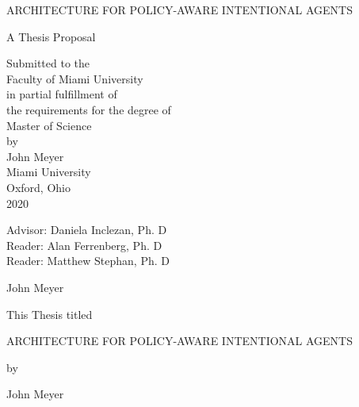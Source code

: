 \documentclass[12pt, oneside]{book2}
\newcommand{\documentTitle}{ARCHITECTURE FOR POLICY-AWARE INTENTIONAL AGENTS}
\newcommand{\documentType}{Thesis Proposal}
\newcommand{\documentAuthor}{John Meyer}
\newcommand{\documentYear}{2020}
\newcommand{\thesisAdvisor}{Daniela Inclezan, Ph. D}
\newcommand{\thesisFirstReader}{Alan Ferrenberg, Ph. D}
\newcommand{\thesisSecondReader}{Matthew Stephan, Ph. D}
\theoremstyle{definition}
\begin{document}
\begin{titlepage}
\begin{center}

    \documentTitle

    \vspace{1.5cm}

    A \documentType \\

    \vspace{0.5cm}

    Submitted to the \\
    Faculty of Miami University \\
    in partial fulfillment of \\
    the requirements for the degree of \\
    Master of Science \\
    by \\
    \documentAuthor \\
    Miami University \\
    Oxford, Ohio \\
    \documentYear

    \vspace{1.5cm}

    Advisor: \thesisAdvisor\\
    Reader: \thesisFirstReader\\
    Reader: \thesisSecondReader\\

    \vspace{1.5cm}

    \textcopyright \documentYear{ }\documentAuthor

    \doclicenseLongText

    \vspace{0.5cm}

    \doclicenseImage

    \newpage

    This Thesis titled

    \vspace{1.0cm}

    \documentTitle

    \vspace{1.0cm}

    by

    \vspace{1.0cm}

    \documentAuthor

    \vspace{1.0cm}


\end{center}
\end{titlepage}
\end{document}
